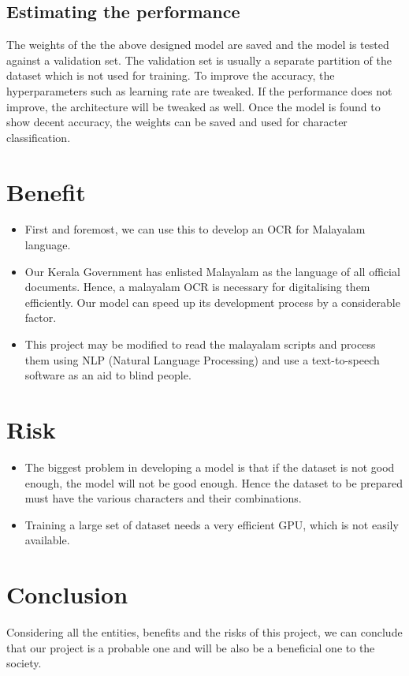\documentclass[12pt]{report}
\begin{document}
\subsection{Estimating the performance}
The weights of the the above designed model are saved and the model is tested against a validation set. The validation set is usually a separate partition of the dataset which is not used for training. To improve the accuracy, the hyperparameters such as learning rate are tweaked. If the performance does not improve, the architecture will be tweaked as well. Once the model is found to show decent accuracy, the weights can be saved and used for character classification. 

\section*{Benefit}
\begin{itemize}
\item First and foremost, we can use this to develop an OCR for Malayalam language.


\item Our Kerala Government has enlisted Malayalam as the language of all official documents. Hence, a malayalam OCR is necessary for digitalising them efficiently. Our model can speed up its development process by a considerable factor.
\item This project may be modified to read the malayalam scripts and process them using NLP (Natural Language Processing) and use a text-to-speech software as an aid to blind people.
\end{itemize}

\section*{Risk}
\begin{itemize}
\item The biggest problem in developing a model is that if the dataset is not good enough, the model will not be good enough. Hence the dataset to be prepared must have the various characters and their combinations.
\item Training a large set of dataset needs a very efficient GPU, which is not easily available.

\end{itemize}


\section*{Conclusion}


 Considering all the entities, benefits and the risks of this project, we can conclude that our project is a probable one and will be also be a beneficial one to the society.
\end{document}
